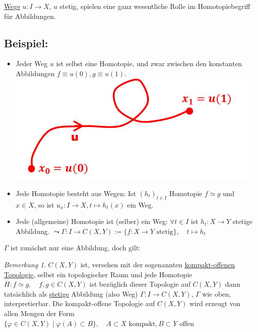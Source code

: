 \documentclass[a4paper,11pt,notitlepage]{report}
\theoremstyle{remark}
\newtheorem{remark}{Bemerkung}[chapter]
\theoremstyle{definition}
\newenvironment{bsp}[1]
{
\setlength{\fboxsep}{10pt}
\subsection*{Beispiel: #1}
\begin{upshape}
}
{
\end{upshape}
}
\begin{document}
\underline{Wege} $u \colon I \rightarrow X$, $u$ stetig, spielen eine ganz wesentliche Rolle im Homotopiebegriff für Abbildungen.

\begin{bsp}{}
	\begin{itemize}
		\item Jeder Weg $u$ ist selbst eine Homotopie, und zwar zwischen den konstanten Abbildungen $f \equiv u(0), g \equiv u(1)$.
			\newline \includegraphics[scale=0.4]{images/Weg_als_Homotopie.jpg}
		\item Jede Homotopie besteht aus Wegen:
			\newline Ist $(h_t)_{t \in I}$ Homotopie $f \simeq g$ und $x \in X$, so ist 
			$u_x \colon I \rightarrow X, t \mapsto h_t(x)$ ein Weg.
		\item Jede (allgemeine) Homotopie ist (selber) ein Weg: \newline
		$\forall t \in I$ ist $h_t \colon X \rightarrow Y$ stetige Abbildung.
		\newline
		$\leadsto \Gamma \colon I \rightarrow C(X,Y) := \{f \colon X \rightarrow Y \text{ stetig}\}, \quad t \mapsto h_t$
	\end{itemize}
	$\Gamma$ ist zunächst nur eine Abbildung, doch gilt:
	\begin{remark}{}
	$C(X,Y)$ ist, versehen mit der sogenannten \underline{kompakt-offenen} \underline{Topologie}, selbst ein topologischer Raum und jede Homotopie $H \colon f \simeq g, \quad f,g \in C(X,Y)$ ist bezüglich dieser Topologie auf $C(X,Y)$ dann tatsächlich als \underline{stetige} Abbildung (also Weg) $\Gamma \colon I \rightarrow C(X,Y)$, $\Gamma$ wie oben, interpretierbar.
\newline
Die kompakt-offene Topologie auf $C(X,Y)$ wird erzeugt von allen Mengen der Form $\{\varphi \in C(X,Y) \mid \varphi(A) \subset B\}, \quad A \subset X \text{ kompakt}, B \subset Y \text{ offen}$
\end{remark}

\end{bsp}
\end{document}

